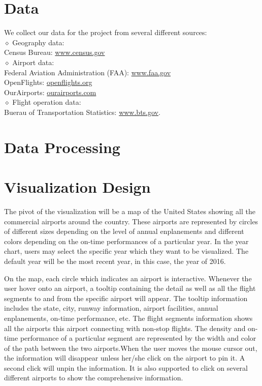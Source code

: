 \documentclass[12pt]{article}
\begin{document}
\section{Data}
    \noindent We collect our data for the project from several different sources:\\
    $\diamond$ Geography data:\\
    \indent Census Bureau: \url{www.census.gov}\\
    $\diamond$ Airport data:\\
    \indent Federal Aviation Administration (FAA): \url{www.faa.gov}\\
    \indent OpenFlights: \url{openflights.org}\\
    \indent OurAirports: \url{ourairports.com}\\
    $\diamond$ Flight operation data:\\
    \indent Buerau of Transportation Statistics: \url{www.bts.gov}.

\section{Data Processing}

\section{Visualization Design}

The pivot of the visualization will be a map of the United States showing all the commercial airports around the country. These airports are represented by circles of different sizes depending on the level of annual enplanements and different colors depending on the on-time performances of a particular year. In the year chart, users may select the specific year which they want to be visualized. The default year will be the most recent year, in this case, the year of 2016.

On the map, each circle which indicates an airport is interactive. Whenever the user hover onto an airport, a tooltip containing the detail as well as all the flight segments to and from the specific airport will appear. The tooltip information includes the state, city, runway information, airport facilities, annual enplanements, on-time performance, etc. The flight segments information shows all the airports this airport connecting with non-stop flights. The density and on-time performance of a particular segment are represented by the width and color of the path between the two airports.When the user moves the mouse cursor out, the information will disappear unless her/she click on the airport to pin it. A second click will unpin the information. It is also supported to click on several different airports to show the comprehensive information.
\end{document}
